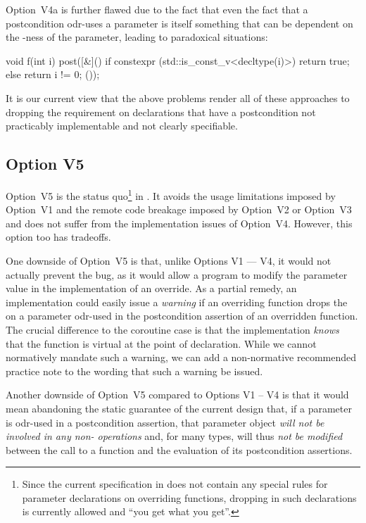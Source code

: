 Option~V4a is further flawed due to the fact that even the fact that a postcondition odr-uses a parameter is itself something that can be dependent on the -ness of the parameter, leading to paradoxical situations:
\begin{codeblock}
void f(int i)
  post([&]() {
    if constexpr (std::is_const_v<decltype(i)>) {
      return true; 
    } else {
      return i != 0;
    }
  }());
\end{codeblock}

It is our current view that the above problems render all of these approaches to dropping the  requirement on declarations that have a postcondition not practicably implementable and not clearly specifiable. 

\subsection*{Option V5}

Option~V5 is the status quo\footnote{Since the current specification in \cite{P2900R10} does not contain any special rules for parameter declarations on overriding functions, dropping  in such declarations is currently allowed and ``you get what you get''.} in \cite{P2900R10}. It avoids the usage limitations imposed by Option~V1 and the remote code breakage imposed by Option~V2 or Option~V3 and does not suffer from the implementation issues of Option~V4. However, this option too has tradeoffs.

One downside of Option~V5 is that, unlike Options V1 --- V4, it would not actually prevent the bug, as it would allow a program to modify the parameter value in the implementation of an override. As a partial remedy, an implementation could easily issue a \emph{warning} if an overriding function drops the  on a parameter odr-used in the postcondition assertion of an overridden function. The crucial difference to the coroutine case is that the implementation \emph{knows} that the function is virtual at the point of declaration. While we cannot normatively mandate such a warning, we can add a non-normative recommended practice note to the wording that such a warning be issued. 

Another downside of Option~V5 compared to Options V1 -- V4 is that it would mean abandoning the static guarantee of the current \cite{P2900R10} design that, if a parameter is odr-used in a postcondition assertion, that parameter object \emph{will not be involved in any non- operations} and, for many types, will thus \emph{not be modified} between the call to a function and the evaluation of its postcondition assertions.


